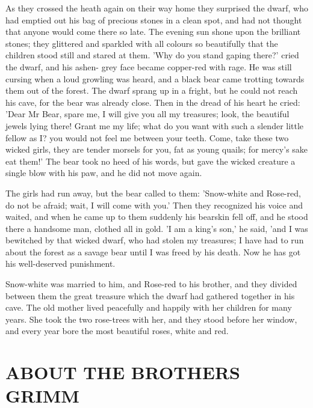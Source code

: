 \documentclass[12pt]{book}
\begin{document}
As they crossed the heath again on their way home they surprised the
dwarf, who had emptied out his bag of precious stones in a clean spot,
and had not thought that anyone would come there so late. The evening
sun shone upon the brilliant stones; they glittered and sparkled with
all colours so beautifully that the children stood still and stared at
them. 'Why do you stand gaping there?' cried the dwarf, and his ashen-
grey face became copper-red with rage. He was still cursing when a
loud growling was heard, and a black bear came trotting towards them
out of the forest. The dwarf sprang up in a fright, but he could not
reach his cave, for the bear was already close. Then in the dread of
his heart he cried: 'Dear Mr Bear, spare me, I will give you all my
treasures; look, the beautiful jewels lying there! Grant me my life;
what do you want with such a slender little fellow as I? you would not
feel me between your teeth. Come, take these two wicked girls, they
are tender morsels for you, fat as young quails; for mercy's sake eat
them!' The bear took no heed of his words, but gave the wicked
creature a single blow with his paw, and he did not move again.

The girls had run away, but the bear called to them: 'Snow-white and
Rose-red, do not be afraid; wait, I will come with you.' Then they
recognized his voice and waited, and when he came up to them suddenly
his bearskin fell off, and he stood there a handsome man, clothed all
in gold. 'I am a king's son,' he said, 'and I was bewitched by that
wicked dwarf, who had stolen my treasures; I have had to run about the
forest as a savage bear until I was freed by his death. Now he has got
his well-deserved punishment.

Snow-white was married to him, and Rose-red to his brother, and they
divided between them the great treasure which the dwarf had gathered
together in his cave. The old mother lived peacefully and happily with
her children for many years. She took the two rose-trees with her, and
they stood before her window, and every year bore the most beautiful
roses, white and red.

\appendix

\chapter{ABOUT THE BROTHERS GRIMM}
\end{document}
